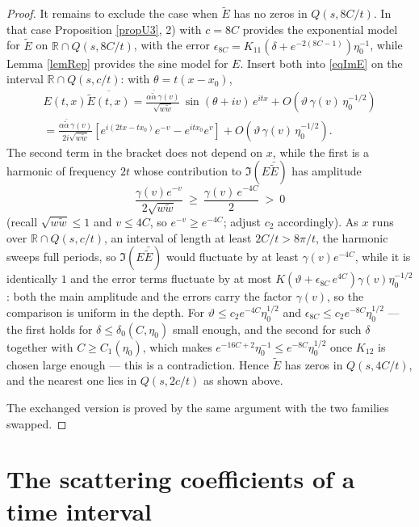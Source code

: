 \documentclass[11pt,twoside,reqno]{amsart}
\def\ti{\tilde}
\def\R{{\mathbb R}}
\def\d{\delta}
\def\g{\gamma}
\def\a{\alpha}
\theoremstyle{plain}
\numberwithin{equation}{section}
\begin{document}
\begin{proof}
It remains to exclude the case when $\ti E$ has no zeros in $Q(s,8C/t)$. In that case Proposition \ref{propU3}, 2) with $c=8C$ provides the exponential model for $\ti E$ on $\R\cap Q(s,8C/t)$, with the error $\epsilon_{8C}=K_{11}(\d+e^{-2(8C-1)})\eta_0^{-1}$, while Lemma \ref{lemRep} provides the sine model for $E$. Insert both into \eqref{eqImE} on the interval $\R\cap Q(s,c/t)$: with $\theta=t(x-x_0)$,
$$\begin{gathered}
E(t,x)\overline{\ti E(t,x)}=\frac{\a\bar{\ti\a}\,\g(v)}{\sqrt{w\ti w}}\,\sin(\theta+iv)\,e^{itx}+O\left(\vartheta\,\g(v)\,\eta_0^{-1/2}\right)\\
=\frac{\a\bar{\ti\a}\,\g(v)}{2i\sqrt{w\ti w}}\left[e^{i(2tx-tx_0)}e^{-v}-e^{itx_0}e^{v}\right]+O\left(\vartheta\,\g(v)\,\eta_0^{-1/2}\right).
\end{gathered}$$
The second term in the bracket does not depend on $x$, while the first is a harmonic of frequency $2t$ whose contribution to $\Im\left(E\bar{\ti E}\right)$ has amplitude
$$\frac{\g(v)e^{-v}}{2\sqrt{w\ti w}}\ \geq\ \frac{\g(v)\,e^{-4C}}{2}\ >\ 0$$
(recall $\sqrt{w\ti w}\leq1$ and $v\leq4C$, so $e^{-v}\geq e^{-4C}$; adjust $c_2$ accordingly). As $x$ runs over $\R\cap Q(s,c/t)$, an interval of length at least $2C/t>8\pi/t$, the harmonic sweeps full periods, so $\Im\left(E\bar{\ti E}\right)$ would fluctuate by at least $\g(v)e^{-4C}$, while it is identically $1$ and the error terms fluctuate by at most $K\left(\vartheta+\epsilon_{8C}\,e^{4C}\right)\g(v)\eta_0^{-1/2}$: both the main amplitude and the errors carry the factor $\g(v)$, so the comparison is uniform in the depth. For $\vartheta\leq c_2e^{-4C}\eta_0^{1/2}$ and $\epsilon_{8C}\leq c_2e^{-8C}\eta_0^{1/2}$ --- the first holds for $\d\leq\d_0(C,\eta_0)$ small enough, and the second for such $\d$ together with $C\geq C_1(\eta_0)$, which makes $e^{-16C+2}\eta_0^{-1}\leq e^{-8C}\eta_0^{1/2}$ once $K_{12}$ is chosen large enough --- this is a contradiction. Hence $\ti E$ has zeros in $Q(s,4C/t)$, and the nearest one lies in $Q(s,2c/t)$ as shown above.

The exchanged version is proved by the same argument with the two families swapped.
\end{proof}

\section{The scattering coefficients of a time interval} \label{secPMT}
\end{document}
